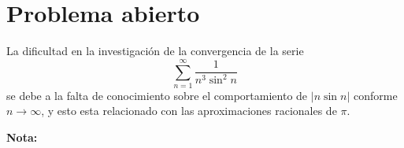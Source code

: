 \documentclass{article}
\begin{document}
\section{Problema abierto}
La dificultad en la investigaci\'on de la convergencia de la
serie
$$\sum_{n=1}^\infty\frac{1}{n^3\sin^2n}$$
se debe a la falta de conocimiento sobre el comportamiento
de $|n\sin n|$ conforme $n \rightarrow \infty$,
y esto esta relacionado con las aproximaciones racionales
de $\pi$.

{\large \bf Nota:}
\end{document}
